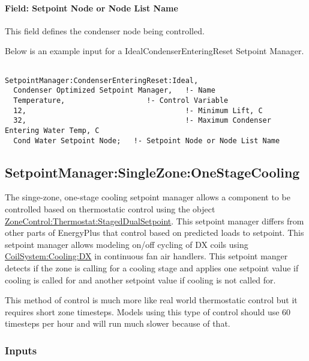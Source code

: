 \paragraph{Field: Setpoint Node or Node List Name}\label{field-setpoint-node-or-node-list-name-1}

This field defines the condenser node being controlled.

Below is an example input for a IdealCondenserEnteringReset Setpoint Manager.

\begin{lstlisting}

SetpointManager:CondenserEnteringReset:Ideal,
  Condenser Optimized Setpoint Manager,   !- Name
  Temperature,                   !- Control Variable
  12,                                     !- Minimum Lift, C
  32,                                     !- Maximum Condenser Entering Water Temp, C
  Cond Water Setpoint Node;   !- Setpoint Node or Node List Name
\end{lstlisting}

\subsection{SetpointManager:SingleZone:OneStageCooling}\label{setpointmanagersinglezoneonestagecooling}

The singe-zone, one-stage cooling setpoint manager allows a component to be controlled based on thermostatic control using the object \hyperref[zonecontrolthermostatstageddualsetpoint]{ZoneControl:Thermostat:StagedDualSetpoint}. This setpoint manager differs from other parts of EnergyPlus that control based on predicted loads to setpoint. This setpoint manager allows modeling on/off cycling of DX coils using \hyperref[coilsystemcoolingdx]{CoilSystem:Cooling:DX} in continuous fan air handlers. This setpoint manger detects if the zone is calling for a cooling stage and applies one setpoint value if cooling is called for and another setpoint value if cooling is not called for.

This method of control is much more like real world thermostatic control but it requires short zone timesteps. Models using this type of control should use 60 timesteps per hour and will run much slower because of that.

\subsubsection{Inputs}\label{inputs-25-002}

